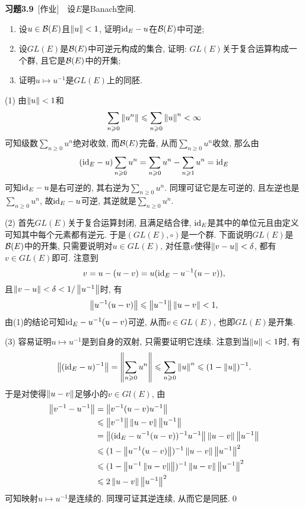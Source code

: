 	\textbf{习题3.9}\ [作业]\ \ 设$ E $是Banach空间.
	\begin{enumerate}[(1)]
	\item 设$ u\in\mathcal{B}(E) $且$ \left\| u \right\|<1 $, 证明$ \mathrm{id}_E-u $在$ \mathcal{B}(E) $中可逆;
	\item 设$ GL(E) $是$ \mathcal{B}(E) $中可逆元构成的集合, 证明: $ GL(E) $关于复合运算构成一个群, 且它是$ \mathcal{B}(E) $中的开集;
	\item 证明$ u\mapsto u^{-1} $是$ GL(E) $上的同胚.
	\end{enumerate}
	
	\begin{Proof}
	(1) 由$ \left\| u \right\|<1 $和
	\[
	\sum_{n\geqslant 0}\left\| u^n \right\|\leqslant\sum_{n\geqslant 0}\left\| u \right\|^n<\infty
	\]
	可知级数$ \sum\limits_{n\geqslant 0}u^n $绝对收敛, 而$ \mathcal{B}(E) $完备, 从而$ \sum\limits_{n\geqslant 0}u^n $收敛, 那么由
	\[
	(\mathrm{id}_E-u)\sum_{n\geqslant 0}u^n=\sum_{n\geqslant 0}u^n-\sum_{n\geqslant 1}u^n=\mathrm{id}_E
	\]
	可知$ \mathrm{id}_E-u $是右可逆的, 其右逆为$ \sum\limits_{n\geqslant 0}u^n $. 同理可证它是左可逆的, 且左逆也是$ \sum\limits_{n\geqslant 0}u^n $, 故$ \mathrm{id}_E-u $可逆, 其逆就是$ \sum\limits_{n\geqslant 0}u^n $.
	
	(2) 首先$ GL(E) $关于复合运算封闭, 且满足结合律, $ \mathrm{id}_E $是其中的单位元且由定义可知其中每个元素都有逆元. 于是$ (GL(E),\circ) $是一个群. 下面说明$ GL(E) $是$ \mathcal{B}(E) $中的开集, 只需要说明对$ u\in GL(E) $, 对任意$ v $使得$ \left\| v-u \right\|<\delta $, 都有$ v\in GL(E) $即可. 注意到
	\[
	v=u-(u-v)=u(\mathrm{id}_E-u^{-1}(u-v)),
	\]
	且$ \left\| v-u \right\|<\delta<1/\left\| u^{-1} \right\| $时, 有
	\[
	\left\| u^{-1}(u-v) \right\|\leqslant \left\| u^{-1} \right\|\left\| u-v \right\|<1,
	\]
	由(1)的结论可知$ \mathrm{id}_E-u^{-1}(u-v) $可逆, 从而$ v\in GL(E) $, 也即$ GL(E) $是开集.
	
	(3) 容易证明$ u\mapsto u^{-1} $是到自身的双射, 只需要证明它连续. 注意到当$ \left\| u \right\|<1 $时, 有
	\[
	\left\| (\mathrm{id}_E-u)^{-1} \right\|=\left\| \sum_{n\geqslant 0}u^n \right\|\leqslant\sum_{n\geqslant 0}\left\| u \right\|^n\leqslant(1-\left\| u \right\|)^{-1}.
	\]
	于是对使得$ \left\| u-v \right\| $足够小的$ v\in Gl(E) $, 由
	\begin{align*}
	\left\| v^{-1}-u^{-1} \right\|&=\left\| v^{-1}(u-v)u^{-1} \right\|\\
	&\leqslant\left\| v^{-1} \right\|\left\| u-v \right\|\left\| u^{-1} \right\|\\
	&=\left\| (\mathrm{id}_E-u^{-1}(u-v))^{-1}u^{-1} \right\|\left\| u-v \right\|\left\| u^{-1} \right\|\\
	&\leqslant(1-\left\| u^{-1}(u-v) \right\|)^{-1}\left\| u-v \right\|\left\| u^{-1} \right\|^2\\
	&\leqslant(1-\left\| u^{-1}\left\| u-v \right\| \right\|)^{-1}\left\| u-v \right\|\left\| u^{-1} \right\|^2\\
	&\leqslant 2\left\| u-v \right\|\left\| u^{-1} \right\|^2
	\end{align*}
	可知映射$ u\mapsto u^{-1} $是连续的. 同理可证其逆连续, 从而它是同胚.\qed
	\end{Proof}
	
